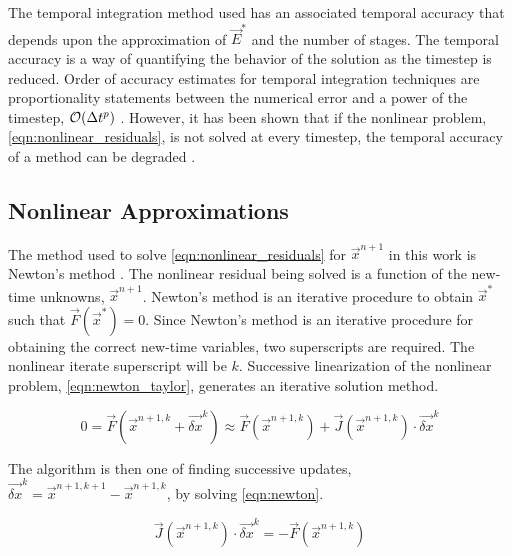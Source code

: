 The temporal integration method used has an associated temporal accuracy that depends upon the approximation of $\vec{E}^{*}$ and the number of stages. 
The temporal accuracy is a way of quantifying the behavior of the solution as the timestep is reduced.
Order of accuracy estimates for temporal integration techniques are proportionality statements between the numerical error and a power of the timestep, $\mathcal{O}(\dt{}^{p})$ \cite{LeVeque2007}. 
However, it has been shown that if the nonlinear problem, \eqref{eqn:nonlinear_residuals}, is not solved at every timestep, the temporal accuracy of a method can be degraded \cite{Knoll2001, Mahaffy1993}.

\subsection{Nonlinear Approximations}
\label{subsect:nonlinear_approximations}

The method used to solve \eqref{eqn:nonlinear_residuals} for $\vec{x}^{n+1}$ in this work is Newton's method \cite{Deuflhard2004, Dennis1996}.
The nonlinear residual being solved is a function of the new-time unknowns, $\vec{x}^{n+1}$.
Newton's method is an iterative procedure to obtain $\vec{x}^{*}$ such that $\vec{F}(\vec{x}^{*}) = 0$.
Since Newton's method is an iterative procedure for obtaining the correct new-time variables, two superscripts are required.
The nonlinear iterate superscript will be $k$.
Successive linearization of the nonlinear problem, \eqref{eqn:newton_taylor}, generates an iterative solution method.

\begin{equation}
\label{eqn:newton_taylor}
0 = \vec{F}(\vec{x}^{n+1,k}+\vec{\delta x}^k) \approx \vec{F}(\vec{x}^{n+1,k}) + \vec{J}(\vec{x}^{n+1,k}) \cdot \vec{\delta x}^k
\end{equation}

The algorithm is then one of finding successive updates, $\vec{\delta x}^k = \vec{x}^{n+1,k+1} - \vec{x}^{n+1,k}$, by solving \eqref{eqn:newton}.

\begin{equation}
\label{eqn:newton}
\vec{J}(\vec{x}^{n+1,k})\cdot \vec{\delta x}^k = -\vec{F}(\vec{x}^{n+1,k})
\end{equation} 


